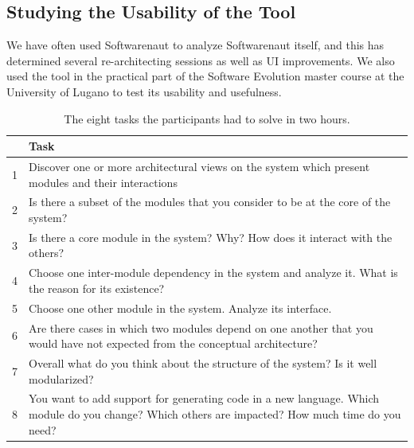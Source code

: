\documentclass[preprint,12pt]{elsarticle}
\begin{document}

\subsection {Studying the Usability of the Tool}
\label{sec:usability}
We have often used Softwarenaut to analyze Softwarenaut itself, and this has determined several re-architecting sessions as well as UI improvements. We also used the tool in the practical part of the Software Evolution master course at the University of Lugano to test its usability and usefulness. 

\begin{table}[b!]
\begin{center}
\begin{tabular}{l p{\linewidth}}
& \footnotesize{Task} \\ \hline
\footnotesize{1} & \footnotesize{Discover one or more architectural views on the system which present modules and their interactions} \\
\footnotesize{2} & \footnotesize {Is there a subset of the modules that you consider to be at the core of the system?} \\
\footnotesize{3} & \footnotesize {Is there a core module in the system? Why? How does it interact with the others?} \\
\footnotesize{4} & \footnotesize {Choose one inter-module dependency in the system and analyze it. What is the reason for its existence?} \\
\footnotesize{5} & \footnotesize {Choose one other module in the system. Analyze its interface.} \\
\footnotesize{6} & \footnotesize {Are there cases in which two modules depend on one another that you would have not expected from the conceptual architecture?} \\
\footnotesize{7} & \footnotesize {Overall what do you think about the structure of the system? Is it well modularized?} \\
\footnotesize{8} & \footnotesize {You want to add support for generating code in a new language. Which module do you change? Which others are impacted? How much time do you need?} \\ \hline
\end{tabular}
\caption{The eight tasks the participants had to solve in two hours.}
\label{tab:questions}
\end{center}
\end{table}
\end{document}
